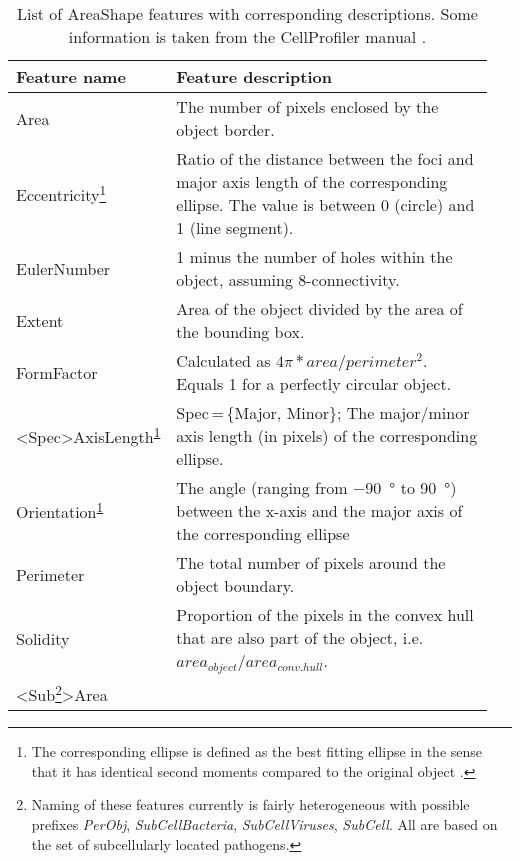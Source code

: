 \renewcommand{\arraystretch}{1.5}
\setlength{\tabcolsep}{0.2em}
\begin{table}
  \begin{minipage}{\textwidth}
  \centering
  \caption[List of AreaShape features with corresponding descriptions.]{List of AreaShape features with corresponding descriptions. Some information is taken from the CellProfiler manual \citep{Carpenter2006}.}
  \label{tab:areashape-feats}
  \footnotesize
  \begin{tabular}{L{0.25\linewidth}L{0.7\linewidth}}
    Feature name &
      Feature description \\
    \hline 
    Area &
      The number of pixels enclosed by the object border. \\
    Eccentricity\footnote{\label{fn:ellipse} The corresponding ellipse is defined as the best fitting ellipse in the sense that it has identical second moments compared to the original object \citep{Rocha2002}.} &
      Ratio of the distance between the foci and major axis length of the corresponding ellipse. The value is between 0 (circle) and 1 (line segment).\\
    EulerNumber &
      1 minus the number of holes within the object, assuming 8-connectivity. \\
    Extent &
      Area of the object divided by the area of the bounding box. \\
    FormFactor &
      Calculated as $4\pi*area/perimeter^2$. Equals 1 for a perfectly circular object. \\
    <Spec>AxisLength\textsuperscript{\ref{fn:ellipse}} &
      Spec\,=\,\{Major, Minor\}; The major\slash minor axis length (in pixels) of the corresponding ellipse. \\
    Orientation\textsuperscript{\ref{fn:ellipse}} &
      The angle (ranging from \SI{-90}{\degree} to \SI{90} {\degree}) between the x-axis and the major axis of the corresponding ellipse \\
    Perimeter &
      The total number of pixels around the object boundary. \\
    Solidity &
      Proportion of the pixels in the convex hull that are also part of the object, i.e. $area_{object}/area_{conv. hull}$. \\
    <Sub\footnote{\label{fn:subcellular} Naming of these features currently is fairly heterogeneous with possible prefixes \textit{PerObj}, \textit{SubCellBacteria}, \textit{SubCellViruses}, \textit{SubCell}. All are based on the set of subcellularly located pathogens.}>Area &

\end{tabular}
\end{minipage}
\end{table}
